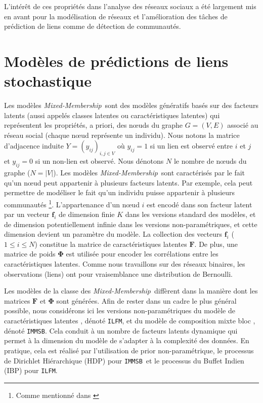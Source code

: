 \documentclass[french]{hermes-journal}
\newcommand{\ilfm}{\texttt{ILFM}}
\newcommand{\immsb}{\texttt{IMMSB}}
\newcommand{\mmm}{\textit{Mixed-Membership}~}
\newcommand{\mat}[1]{\bm{#1}}
\begin{document}
L'intérêt de ces propriétés dans l'analyse des réseaux sociaux a été largement mis en avant pour la modélisation de réseaux et l'amélioration des tâches de prédiction de liens comme de détection de communautés.


\section{Modèles de prédictions de liens stochastique}

Les modèles \mmm sont des modèles génératifs basés sur des facteurs latents (aussi appelés classes latentes ou caractéristiques latentes) qui représentent les propriétés, a priori, des n\oe{}uds du graphe $G=(V,E)$ associé au réseau social (chaque n\oe{}ud représente un individu). Nous notons la matrice d'adjacence induite $Y=(y_{ij})_{i,j\in V}$ où $y_{ij}=1$ si un lien est observé entre $i$ et $j$ et $y_{ij}=0$ si un non-lien est observé. Nous dénotons $N$ le nombre de n\oe{}uds du graphe ($N=|V|$). Les modèles \mmm sont caractérisés par le fait qu'un n\oe{}ud peut appartenir à plusieurs facteurs latents. Par exemple, cela peut permettre de modéliser le fait qu'un individu puisse appartenir à plusieurs communautés \footnote{Comme mentionné dans \cite{goldenberg2010survey} }. L'appartenance d'un n\oe{}ud $i$ est encodé dans son facteur latent par un vecteur $\mat{f}_i$ de dimension finie $K$ dans les versions standard des modèles, et de dimension potentiellement infinie dans les versions non-paramétriques, et cette dimension devient un paramètre du modèle. La collection des vecteurs $\mat{f}_{i}$ ($1 \le i \le N$) constitue la matrice de caractéristiques latentes $\mat{F}$. De plus, une matrice de poids $\mat{\Phi}$ est utilisée pour encoder les corrélations entre les caractéristiques latentes. Comme nous travaillons sur des réseaux binaires, les observations (liens) ont pour vraisemblance une distribution de Bernoulli.

Les modèles de la classe des \mmm diffèrent dans la manière dont les matrices $\mat{F}$ et $\mat{\Phi}$ sont générées. Afin de rester dans un cadre le plus général possible, nous considérons ici les versions non-paramétriques du modèle de caractéristiques latentes \cite{ILFRM}, dénoté \ilfm, et du modèle de composition mixte bloc  \cite{iMMSB,fan2015dynamic}, dénoté \immsb. Cela conduit à un nombre de facteurs latents dynamique qui permet à la dimension du modèle de s'adapter à la complexité des données. En pratique, cela est réalisé par l'utilisation de prior non-paramétrique, le processus de Dirichlet Hiérarchique (HDP) pour \immsb\ et le processus du Buffet Indien (IBP) pour \ilfm.~\\
\end{document}
